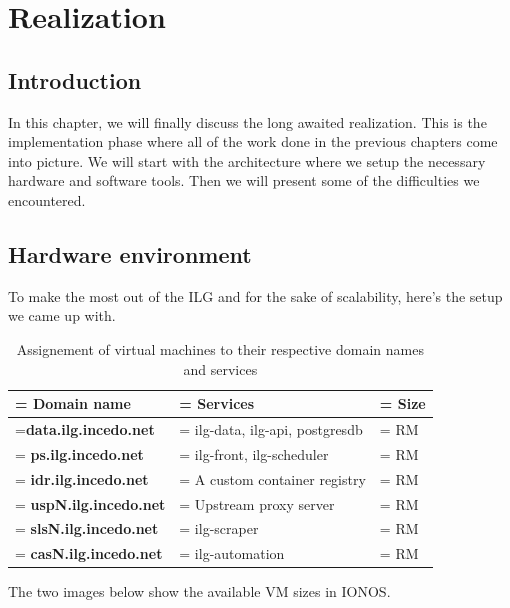 \chapter{Realization}
\newpage

\setcounter{secnumdepth}{0} %
\section{Introduction}
In this chapter, we will finally discuss the long awaited realization.
This is the implementation phase where all of the work done in the previous chapters come into picture.
We will start with the architecture where we setup the necessary hardware and software tools.
Then we will present some of the difficulties we encountered.

\setcounter{secnumdepth}{2} %
\section{Hardware environment}
To make the most out of the ILG and for the sake of scalability, here's the setup we came up with.

\begin{table}[H]
    \renewcommand{\arraystretch}{1.5} %
    \caption{Assignement of virtual machines to their respective domain names and services}
    \centering
    \medskip
    \begin{tabularx}{1\textwidth} {
            | >{\hsize=1.3\hsize\linewidth=\hsize\centering\arraybackslash}X
            | >{\hsize=1.4\hsize\linewidth=\hsize\centering\arraybackslash}X
            | >{\hsize=0.3\hsize\linewidth=\hsize\centering\arraybackslash}X |}
        \hline
        \rowcolor{primary} \textbf{Domain name} & \textbf{Services}             & \textbf{Size} \\
        \hline
        \textbf{data.ilg.incedo.net}            & ilg-data, ilg-api, postgresdb & RM            \\
        \hline
        \textbf{ps.ilg.incedo.net}              & ilg-front, ilg-scheduler      & RM            \\
        \hline
        \textbf{idr.ilg.incedo.net}             & A custom container registry   & RM            \\
        \hline
        \textbf{uspN.ilg.incedo.net}            & Upstream proxy server         & RM            \\
        \hline
        \textbf{slsN.ilg.incedo.net}            & ilg-scraper                   & RM            \\
        \hline
        \textbf{casN.ilg.incedo.net}            & ilg-automation                & RM            \\
        \hline
    \end{tabularx}
\end{table}
The two images below show the available VM sizes in IONOS.

